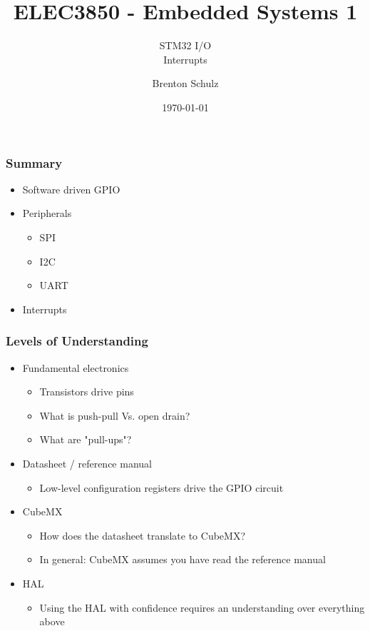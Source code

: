 \documentclass[14pt]{beamer}
\title{ELEC3850 - Embedded Systems 1}
\subtitle{STM32 I/O\\Interrupts}
\author{Brenton Schulz}
\institute{University of Newcastle}
\date{\today}
\begin{document}
\titlepage

\begin{frame}
\frametitle{Summary}
\begin{itemize}
\item Software driven GPIO
\item Peripherals
	\begin{itemize}
		\item SPI
		\item I2C
		\item UART
	\end{itemize}
\item Interrupts
\end{itemize}
\end{frame}

\begin{frame}[fragile]
\frametitle{Levels of Understanding}
\begin{itemize}
\item Fundamental electronics
	\begin{itemize}
		\item Transistors drive pins
		\item What is push-pull Vs. open drain?
		\item What are "pull-ups"?
	\end{itemize}
\item Datasheet / reference manual
	\begin{itemize}
		\item Low-level configuration registers drive the GPIO circuit
	\end{itemize}
\item CubeMX
	\begin{itemize}
		\item How does the datasheet translate to CubeMX?
		\item In general: CubeMX assumes you have read the reference manual
	\end{itemize}
\item HAL
	\begin{itemize}
		\item Using the HAL with confidence requires an understanding over everything above
	\end{itemize}
\end{itemize}
\end{frame}
\end{document}
